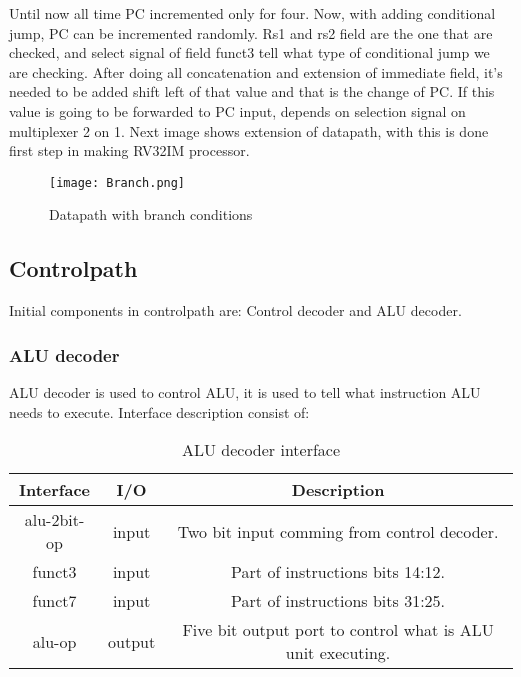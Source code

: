 \documentclass{scrreprt}
\begin{document}
Until now all time PC incremented only for four. Now, with adding conditional jump, PC can be incremented randomly. Rs1 and rs2 field are the one that are checked, and select signal of field funct3 tell what type of conditional jump we are checking. 
After doing all concatenation and extension of immediate field, it's needed to be added shift left of that value and that is the change of PC. If this value is going to be forwarded to PC input, depends on selection signal on multiplexer 2 on 1. 
Next image shows extension of datapath, with this is done first step in making RV32IM processor. 

\begin{figure}[htb!]
    \centering
    \texttt{[image: Branch.png]}
    \caption{Datapath with branch conditions}
    \label{fig:branch}
\end{figure}
\subsection*{Controlpath}
Initial components in controlpath are: Control decoder and ALU decoder. 
    \subsubsection*{ALU decoder}
        ALU decoder is used to control ALU, it is used to tell what instruction ALU needs to execute. Interface description consist of:
        \begin{table}[htb!]
        \centering
        \begin{tabular}{|c|c|c|} \hline 
             Interface & I/O & Description \\ \hline  
             alu-2bit-op & input & Two bit input comming from control decoder. \\ \hline  
             funct3 & input & Part of instructions bits 14:12.  \\ \hline
             funct7 & input & Part of instructions bits 31:25. \\ \hline
             alu-op & output & Five bit output port to control what is ALU unit executing.  \\ \hline
        \end{tabular}
        \caption{ALU decoder interface}
        \label{tab:ALUdecoder}
    \end{table}    
\end{document}
